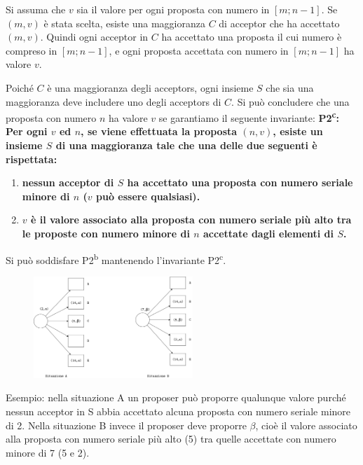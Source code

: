 \vspace{5mm}
Si assuma che $v$ sia il valore per ogni proposta con numero in $[m;n-1]$. Se $(m, v)$ è stata scelta, esiste una maggioranza $C$ di acceptor che ha accettato $(m, v)$. Quindi ogni acceptor in $C$ ha accettato una proposta il cui numero è compreso in $[m;n-1]$, e ogni proposta accettata con numero in $[m;n-1]$ ha valore $v$.

Poiché $C$ è una maggioranza degli acceptors, ogni insieme $S$ che sia una maggioranza deve includere uno degli acceptors di $C$. Si può concludere che una proposta con numero $n$ ha valore $v$ se garantiamo il seguente invariante: \newline
\textbf{P2\textsuperscript{c}: Per ogni $v$ ed $n$, se viene effettuata la proposta $(n, v)$, esiste un insieme $S$ di una maggioranza tale che una delle due seguenti è rispettata:}
\renewcommand{\theenumi}{\alph{enumi}}
\begin{enumerate}
    \item \textbf{nessun acceptor di $S$ ha accettato una proposta con numero seriale minore di $n$ ($v$ può essere qualsiasi).}
    \item \textbf{$v$ è il valore associato alla proposta con numero seriale più alto tra le proposte con numero minore di $n$ accettate dagli elementi di $S$.}
\end{enumerate}
Si può soddisfare P2\textsuperscript{b} mantenendo l'invariante P2\textsuperscript{c}.

\begin{figure}[ht]
    \centering
    \includegraphics[width=6cm]{./Images/cap2/2.12.png}
\end{figure}

Esempio: nella situazione A un proposer può proporre qualunque valore purché nessun acceptor in S abbia accettato alcuna proposta con numero seriale minore di 2. Nella situazione B invece il proposer deve proporre $\beta$, cioè il valore associato alla proposta con numero seriale più alto (5) tra quelle accettate con numero minore di 7 (5 e 2).

